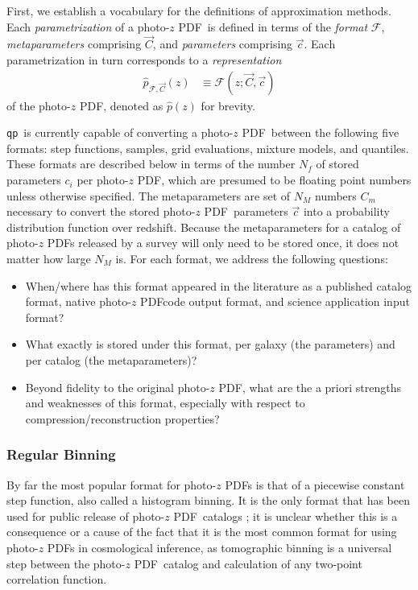 \documentclass[\docopts]{\docclass}
\newcommand{\qp}{\texttt{qp}}
\newcommand{\pz}{photo-$z$ PDF}
\begin{document}
First, we establish a vocabulary for the definitions of approximation methods.  
Each \textit{parametrization} of a \pz\ is defined in terms of the 
\textit{format} $\mathcal{F}$, \textit{metaparameters} comprising $\vec{C}$, 
and \textit{parameters} comprising $\vec{c}$.  Each parametrization in turn 
corresponds to a \textit{representation}
\begin{align}
  \hat{p}_{\mathcal{F}, \vec{C}}(z) &\equiv \mathcal{F}(z;\vec{C}, \vec{c})
\end{align}
of the \pz, denoted as $\hat{p}(z)$ for brevity.

\qp\ is currently capable of converting a \pz\ between the following five 
formats: step functions, samples, grid evaluations, mixture models, and 
quantiles.  These formats are described below in terms of the number $N_{f}$ of 
stored parameters $c_{i}$ per \pz, which are presumed to be floating point 
numbers unless otherwise specified.  The metaparameters are set of $N_{M}$ 
numbers $C_{m}$ necessary to convert the stored \pz\ parameters $\vec{c}$ into 
a probability distribution function over redshift.  Because the metaparameters 
for a catalog of \pz s released by a survey will only need to be stored once, 
it does not matter how large $N_{M}$ is.  For each format, we address the 
following questions:
\begin{itemize}
  \item When/where has this format appeared in the literature as a published 
catalog format, native \pz code output format, and science application input 
format?
  \item What exactly is stored under this format, per galaxy (the parameters) 
and per catalog (the metaparameters)?
  \item Beyond fidelity to the original \pz, what are the a priori strengths 
and weaknesses of this format, especially with respect to 
compression/reconstruction properties?
\end{itemize}

\subsubsection{Regular Binning}
\label{sec:bins}

By far the most popular format for \pz s is that of a piecewise constant step 
function, also called a histogram binning.  It is the only format that has been 
used for public release of \pz\ catalogs \citep{tanaka_photometric_2017, 
sheldon_photometric_2012}; it is unclear whether this is a consequence or a 
cause of the fact that it is the most common format for using \pz s in 
cosmological inference, as tomographic binning is a universal step between the 
\pz\ catalog and calculation of any two-point correlation function.
\end{document}
